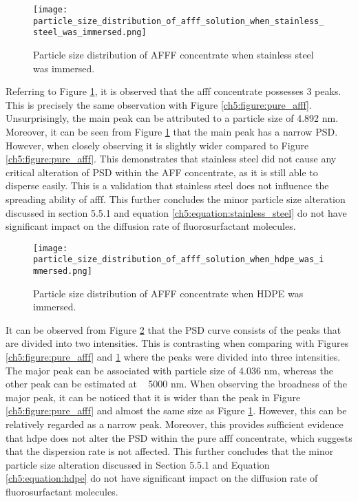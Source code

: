 \begin{figure}[H]
    \centering
    \texttt{[image: particle\_size\_distribution\_of\_afff\_solution\_when\_stainless\_steel\_was\_immersed.png]}
    \caption{Particle size distribution of AFFF concentrate when stainless steel was immersed.}
    \label{ch5:figure:stainless_steel}
\end{figure}

Referring to Figure \ref{ch5:figure:stainless_steel}, it is observed that the \acrshort{afff} concentrate possesses 3 peaks. This is precisely the same observation with Figure \ref{ch5:figure:pure_afff}. Unsurprisingly, the main peak can be attributed to a particle size of 4.892 nm. Moreover, it can be seen from Figure \ref{ch5:figure:stainless_steel} that the main peak has a narrow PSD. However, when closely observing it is slightly wider compared to Figure \ref{ch5:figure:pure_afff}. This demonstrates that stainless steel did not cause any critical alteration of PSD within the AFF concentrate, as it is still able to disperse easily. This is a validation that stainless steel does not influence the spreading ability of \acrshort{afff}. This further concludes the minor particle size alteration discussed in section 5.5.1 and equation \ref{ch5:equation:stainless_steel} do not have significant impact on the diffusion rate of fluorosurfactant molecules.     
  
\begin{figure}[H]
    \centering
    \texttt{[image: particle\_size\_distribution\_of\_afff\_solution\_when\_hdpe\_was\_immersed.png]}
    \caption{Particle size distribution of AFFF concentrate when HDPE was immersed.}
    \label{ch5:figure:hdpe}
\end{figure}

It can be observed from Figure \ref{ch5:figure:hdpe} that the PSD curve consists of the peaks that are divided into two intensities. This is contrasting when comparing with Figures \ref{ch5:figure:pure_afff} and \ref{ch5:figure:stainless_steel} where the peaks were divided into three intensities. The major peak can be associated with particle size of 4.036 nm, whereas the other peak can be estimated at ~ 5000 nm. When observing the broadness of the major peak, it can be noticed that it is wider than the peak in Figure \ref{ch5:figure:pure_afff} and almost the same size as Figure \ref{ch5:figure:stainless_steel}. However, this can be relatively regarded as a narrow peak. Moreover, this provides sufficient evidence that \acrshort{hdpe} does not alter the PSD within the pure \acrshort{afff} concentrate, which suggests that the dispersion rate is not affected. This further concludes that the minor particle size alteration discussed in Section 5.5.1 and Equation \ref{ch5:equation:hdpe} do not have significant impact on the diffusion rate of fluorosurfactant molecules.    
  
